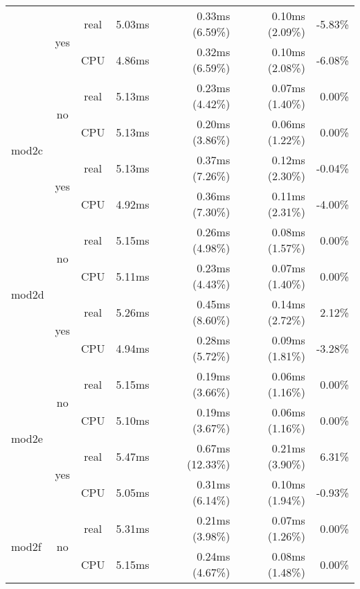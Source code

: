 \documentclass[en]{pracamgr}
\begin{document}
\begin{appendices}
\begin{small}
\begin{longtable}{|l|c|c|r|r|r|r|}
                          \cline{2-7}
                          & \multirow{2}{*}{yes} & real & 5.03ms & 0.33ms (6.59\%) & 0.10ms (2.09\%) & -5.83\% \\*
                          &                      & CPU  & 4.86ms & 0.32ms (6.59\%) & 0.10ms (2.08\%) & -6.08\% \\
\hline
\multirow{4}{*}{mod2c}    & \multirow{2}{*}{no}  & real & 5.13ms & 0.23ms (4.42\%) & 0.07ms (1.40\%) & 0.00\% \\*
                          &                      & CPU  & 5.13ms & 0.20ms (3.86\%) & 0.06ms (1.22\%) & 0.00\% \\*
                          \cline{2-7}
                          & \multirow{2}{*}{yes} & real & 5.13ms & 0.37ms (7.26\%) & 0.12ms (2.30\%) & -0.04\% \\*
                          &                      & CPU  & 4.92ms & 0.36ms (7.30\%) & 0.11ms (2.31\%) & -4.00\% \\
\hline
\multirow{4}{*}{mod2d}    & \multirow{2}{*}{no}  & real & 5.15ms & 0.26ms (4.98\%) & 0.08ms (1.57\%) & 0.00\% \\*
                          &                      & CPU  & 5.11ms & 0.23ms (4.43\%) & 0.07ms (1.40\%) & 0.00\% \\*
                          \cline{2-7}
                          & \multirow{2}{*}{yes} & real & 5.26ms & 0.45ms (8.60\%) & 0.14ms (2.72\%) & 2.12\% \\*
                          &                      & CPU  & 4.94ms & 0.28ms (5.72\%) & 0.09ms (1.81\%) & -3.28\% \\
\hline
\multirow{4}{*}{mod2e}    & \multirow{2}{*}{no}  & real & 5.15ms & 0.19ms (3.66\%) & 0.06ms (1.16\%) & 0.00\% \\*
                          &                      & CPU  & 5.10ms & 0.19ms (3.67\%) & 0.06ms (1.16\%) & 0.00\% \\*
                          \cline{2-7}
                          & \multirow{2}{*}{yes} & real & 5.47ms & 0.67ms (12.33\%) & 0.21ms (3.90\%) & 6.31\% \\*
                          &                      & CPU  & 5.05ms & 0.31ms (6.14\%) & 0.10ms (1.94\%) & -0.93\% \\
\hline
\multirow{4}{*}{mod2f}    & \multirow{2}{*}{no}  & real & 5.31ms & 0.21ms (3.98\%) & 0.07ms (1.26\%) & 0.00\% \\*
                          &                      & CPU  & 5.15ms & 0.24ms (4.67\%) & 0.08ms (1.48\%) & 0.00\% \\*

\end{longtable}
\end{small}
\end{appendices}
\end{document}
